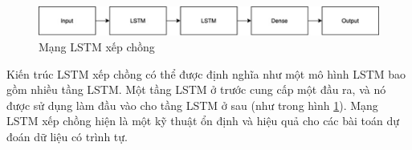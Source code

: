 \vspace{0.5cm}

\begin{figure}[H]
    \centering
    \includegraphics[scale=0.75]{./content/images/2-11.png}
    \caption{Mạng LSTM xếp chồng}
    \label{fig:2-11}
\end{figure}


Kiến trúc LSTM xếp chồng có thể được định nghĩa như một mô hình LSTM bao gồm nhiều tầng LSTM. Một tầng LSTM ở trước cung cấp một đầu ra, và nó được sử dụng làm đầu vào cho tầng LSTM ở sau (như trong hình \ref{fig:2-11}). Mạng LSTM xếp chồng hiện là một kỹ thuật ổn định và hiệu quả cho các bài toán dự đoán dữ liệu có trình tự.